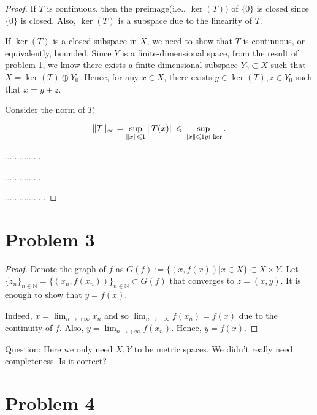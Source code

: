 \documentclass[12pt]{article}
\begin{document}
\begin{proof}

If $T$ is continuous, then the preimage(i.e., $\ker(T)$) of $\{0\}$ is closed since $\{0\}$ is closed. Also, $\ker(T)$ is a subspace due to the linearity of $T$.

If $\ker(T)$ is a closed subspace in $X$, we need to show that $T$ is continuous, or equivalently, bounded. Since $Y$ is a finite-dimensional space, from the result of problem 1, we know there exists a finite-dimensional subspace $Y_0\subset X$ such that $X = \ker(T)\oplus Y_0 $. Hence, for any $x\in X$, there exists $y\in \ker(T), z\in Y_0$ such that $x = y + z$.

Consider the norm of $T$, 

$$
\|T\|_\infty = \sup_{\|x\|\leqslant  1}\|T(x)\| \leqslant\sup_{\|x\|\leqslant  1 \\ y\in \ker} .
$$



...............

................

.................







\end{proof}

\section*{Problem 3}

\begin{proof}

Denote the graph of $f$ as $G(f):= \{ (x, f(x)) | x\in X \} \subset X\times Y$. Let $\{z_n\}_{n\in\mathbb N} = \{ (x_n, f(x_n)) \}_{n\in\mathbb N} \subset G(f)$ that converges to $z = (x, y)$. It is enough to show that $y = f(x)$.

Indeed, $x = \lim_{n\rightarrow +\infty} x_n$ and so $\lim_{n\rightarrow +\infty} f(x_n) = f(x)$ due to the continuity of $f$. Also, $y = \lim_{n\rightarrow +\infty} f(x_n)$. Hence, $y = f(x)$.

\end{proof}

{\color{red}Question:} Here we only need $X, Y$ to be metric spaces. We didn't really need completeness. Is it correct?


\section*{Problem 4}
\end{document}
